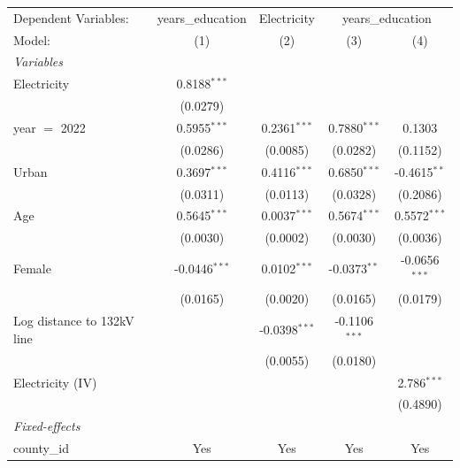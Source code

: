 
\begingroup
\centering
\begin{tabular}{lcccc}
   \tabularnewline \midrule \midrule
   Dependent Variables: & years\_education & Electricity & \multicolumn{2}{c}{years\_education}\\
   Model:                     & (1)             & (2)             & (3)             & (4)\\  
   \midrule
   \emph{Variables}\\
   Electricity                & 0.8188$^{***}$  &                 &                 &   \\   
                              & (0.0279)        &                 &                 &   \\   
   year $=$ 2022              & 0.5955$^{***}$  & 0.2361$^{***}$  & 0.7880$^{***}$  & 0.1303\\   
                              & (0.0286)        & (0.0085)        & (0.0282)        & (0.1152)\\   
   Urban                      & 0.3697$^{***}$  & 0.4116$^{***}$  & 0.6850$^{***}$  & -0.4615$^{**}$\\   
                              & (0.0311)        & (0.0113)        & (0.0328)        & (0.2086)\\   
   Age                        & 0.5645$^{***}$  & 0.0037$^{***}$  & 0.5674$^{***}$  & 0.5572$^{***}$\\   
                              & (0.0030)        & (0.0002)        & (0.0030)        & (0.0036)\\   
   Female                     & -0.0446$^{***}$ & 0.0102$^{***}$  & -0.0373$^{**}$  & -0.0656$^{***}$\\   
                              & (0.0165)        & (0.0020)        & (0.0165)        & (0.0179)\\   
   Log distance to 132kV line &                 & -0.0398$^{***}$ & -0.1106$^{***}$ &   \\   
                              &                 & (0.0055)        & (0.0180)        &   \\   
   Electricity (IV)           &                 &                 &                 & 2.786$^{***}$\\   
                              &                 &                 &                 & (0.4890)\\   
   \midrule
   \emph{Fixed-effects}\\
   county\_id                 & Yes             & Yes             & Yes             & Yes\\  

\end{tabular}
